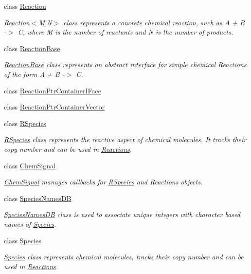 \begin{DoxyCompactItemize}
class \hyperlink{classchem_1_1Reaction}{Reaction}
\begin{DoxyCompactList}\small\item\em Reaction$<$\-M,\-N$>$ class represents a concrete chemical reaction, such as A + B -\/$>$ C, where M is the number of reactants and N is the number of products. \end{DoxyCompactList}\item 
class \hyperlink{classchem_1_1ReactionBase}{Reaction\-Base}
\begin{DoxyCompactList}\small\item\em \hyperlink{classchem_1_1ReactionBase}{Reaction\-Base} class represents an abstract interface for simple chemical Reactions of the form A + B -\/$>$ C. \end{DoxyCompactList}\item 
class \hyperlink{classchem_1_1ReactionPtrContainerIFace}{Reaction\-Ptr\-Container\-I\-Face}
\item 
class \hyperlink{classchem_1_1ReactionPtrContainerVector}{Reaction\-Ptr\-Container\-Vector}
\item 
class \hyperlink{classchem_1_1RSpecies}{R\-Species}
\begin{DoxyCompactList}\small\item\em \hyperlink{classchem_1_1RSpecies}{R\-Species} class represents the reactive aspect of chemical molecules. It tracks their copy number and can be used in \hyperlink{classchem_1_1Reaction}{Reactions}. \end{DoxyCompactList}\item 
class \hyperlink{classchem_1_1ChemSignal}{Chem\-Signal}
\begin{DoxyCompactList}\small\item\em \hyperlink{classchem_1_1ChemSignal}{Chem\-Signal} manages callbacks for \hyperlink{classchem_1_1RSpecies}{R\-Species} and Reactions objects. \end{DoxyCompactList}\item 
class \hyperlink{classchem_1_1SpeciesNamesDB}{Species\-Names\-D\-B}
\begin{DoxyCompactList}\small\item\em \hyperlink{classchem_1_1SpeciesNamesDB}{Species\-Names\-D\-B} class is used to associate unique integers with character based names of \hyperlink{classchem_1_1Species}{Species}. \end{DoxyCompactList}\item 
class \hyperlink{classchem_1_1Species}{Species}
\begin{DoxyCompactList}\small\item\em \hyperlink{classchem_1_1Species}{Species} class represents chemical molecules, tracks their copy number and can be used in \hyperlink{classchem_1_1Reaction}{Reactions}. \end{DoxyCompactList}\item 

\end{DoxyCompactItemize}
